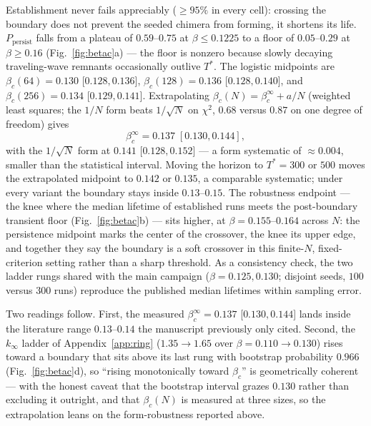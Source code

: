 \documentclass[pdflatex,sn-mathphys,Numbered]{sn-jnl}
\begin{document}
\begin{appendices}
Establishment never fails appreciably ($\ge 95\%$ in every cell): crossing the
boundary does not prevent the seeded chimera from forming, it shortens its
life. $P_{\mathrm{persist}}$ falls from a plateau of $0.59$--$0.75$ at
$\beta \le 0.1225$ to a floor of $0.05$--$0.29$ at $\beta \ge 0.16$
(Fig.~\ref{fig:betac}a) --- the floor is nonzero because slowly decaying
traveling-wave remnants occasionally outlive $T^{*}$. The logistic midpoints
are $\beta_c(64) = 0.130$ [$0.128, 0.136$], $\beta_c(128) = 0.136$
[$0.128, 0.140$], and $\beta_c(256) = 0.134$ [$0.129, 0.141$]. Extrapolating
$\beta_c(N) = \beta_c^{\infty} + a/N$ (weighted least squares; the $1/N$ form
beats $1/\sqrt{N}$ on $\chi^2$, $0.68$ versus $0.87$ on one degree of freedom)
gives
\[
\beta_c^{\infty} = 0.137 \; [0.130, 0.144],
\]
with the $1/\sqrt{N}$ form at $0.141$ [$0.128, 0.152$] --- a form systematic of
${\approx}0.004$, smaller than the statistical interval. Moving the horizon to
$T^{*} = 300$ or $500$ moves the extrapolated midpoint to $0.142$ or $0.135$, a
comparable systematic; under every variant the boundary stays inside
$0.13$--$0.15$. The robustness endpoint --- the knee where the median lifetime
of established runs meets the post-boundary transient floor
(Fig.~\ref{fig:betac}b) --- sits higher, at $\beta = 0.155$--$0.164$ across
$N$: the persistence midpoint marks the center of the crossover, the knee its
upper edge, and together they say the boundary is a soft crossover in this
finite-$N$, fixed-criterion setting rather than a sharp threshold. As a
consistency check, the two ladder rungs shared with the main campaign
($\beta = 0.125, 0.130$; disjoint seeds, $100$ versus $300$ runs) reproduce the
published median lifetimes within sampling error.

Two readings follow. First, the measured $\beta_c^{\infty} = 0.137$
[$0.130, 0.144$] lands inside the literature range $0.13$--$0.14$ the
manuscript previously only cited. Second, the $k_\infty$ ladder of
Appendix~\ref{app:ring} ($1.35 \to 1.65$ over $\beta = 0.110 \to 0.130$) rises
toward a boundary that sits above its last rung with bootstrap probability
$0.966$ (Fig.~\ref{fig:betac}d), so ``rising monotonically toward $\beta_c$''
is geometrically coherent --- with the honest caveat that the bootstrap
interval grazes $0.130$ rather than excluding it outright, and that
$\beta_c(N)$ is measured at three sizes, so the extrapolation leans on the
form-robustness reported above.


\end{appendices}
\end{document}

